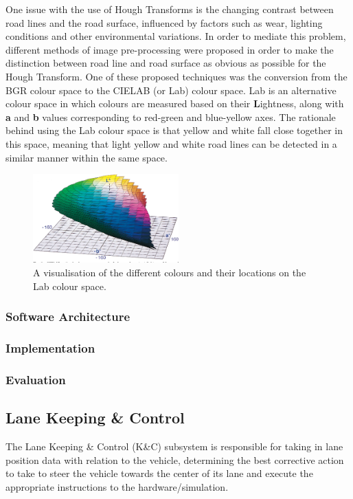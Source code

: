 \documentclass[titlepage]{article}
\begin{document}
One issue with the use of Hough Transforms is the changing contrast between road lines and the road surface, influenced by
factors such as wear, lighting conditions and other environmental variations.
In order to mediate this problem, different methods of image pre-processing were proposed in order to make the distinction
between road line and road surface as obvious as possible for the Hough Transform.
One of these proposed techniques was the conversion from the BGR colour space to the CIELAB (or Lab) colour space.
Lab is an alternative colour space in which colours are measured based on their \textbf{L}ightness, along with \textbf{a} and
\textbf{b} values corresponding to red-green and blue-yellow axes.
The rationale behind using the Lab colour space is that yellow and white fall close together in this space, meaning that light
yellow and white road lines can be detected in a similar manner within the same space.

\begin{figure}
	\centering
	\includegraphics[width=0.5\textwidth]{Lab-colour-space}
	\caption{A visualisation of the different colours and their locations on the Lab colour space.}
\end{figure}


\subsubsection{Software Architecture}
\subsubsection{Implementation}
\subsubsection{Evaluation}

\subsection{Lane Keeping \& Control}
The Lane Keeping \& Control (K\&C) subsystem is responsible for taking in lane position data with relation to the vehicle, determining the best corrective action to take to steer the vehicle towards the center of its lane and execute the appropriate instructions to the hardware/simulation.
\end{document}
